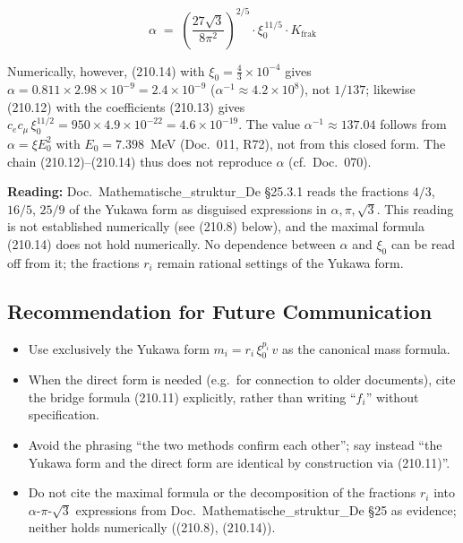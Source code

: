 \begin{equation}
  \boxed{\;\alpha \;=\; \left(\frac{27\sqrt{3}}{8\pi^2}\right)^{2/5}
  \cdot \xi_0^{\,11/5} \cdot K_{\text{frak}}\;}
  \tag{210.14}
\end{equation}

Numerically, however, (210.14) with $\xi_0 = \tfrac43\times10^{-4}$ gives
$\alpha = 0.811 \times 2.98\times10^{-9} = 2.4\times10^{-9}$
($\alpha^{-1} \approx 4.2\times10^{8}$), not $1/137$; likewise (210.12) with the
coefficients (210.13) gives $c_e c_\mu\,\xi_0^{11/2} = 950 \times
4.9\times10^{-22} = 4.6\times10^{-19}$. The value $\alpha^{-1} \approx 137.04$
follows from $\alpha = \xi E_0^2$ with $E_0 = 7.398$~MeV (Doc.~011, R72), not from
this closed form. The chain (210.12)--(210.14) thus does not reproduce
$\alpha$ (cf.\ Doc.~070).

\textbf{Reading:} Doc.~Mathematische\_struktur\_De §25.3.1 reads the
fractions $4/3$, $16/5$, $25/9$ of the Yukawa form as disguised
expressions in $\alpha, \pi, \sqrt{3}$. This reading is not
established numerically (see (210.8) below), and the maximal formula
(210.14) does not hold numerically. No dependence between $\alpha$ and
$\xi_0$ can be read off from it; the fractions $r_i$ remain rational
settings of the Yukawa form.

\subsection*{Recommendation for Future Communication}

\begin{itemize}
  \item Use exclusively the Yukawa form $m_i = r_i\,\xi_0^{p_i}\,v$
        as the canonical mass formula.
  \item When the direct form is needed (e.g.\ for connection to older
        documents), cite the bridge formula (210.11) explicitly,
        rather than writing \enquote{$f_i$} without specification.
  \item Avoid the phrasing \enquote{the two methods confirm each
        other}; say instead \enquote{the Yukawa form and the direct
        form are identical by construction via (210.11)}.
  \item Do not cite the maximal formula or the decomposition of the
        fractions $r_i$ into $\alpha$-$\pi$-$\sqrt{3}$ expressions
        from Doc.~Mathematische\_struktur\_De §25 as evidence; neither
        holds numerically ((210.8), (210.14)).
\end{itemize}

